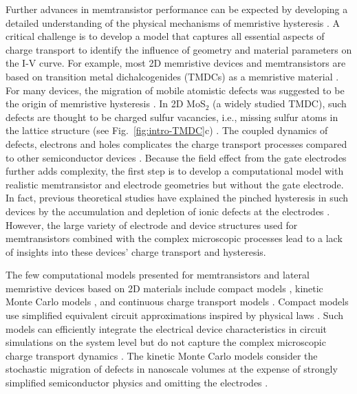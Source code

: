 \documentclass[10pt,a4paper, final]{article}
\theoremstyle{definition}								%
\numberwithin{equation}{section}
\numberwithin{figure}{section}
\numberwithin{theorem}{section}
\begin{document}
Further advances in memtransistor performance can be expected by developing a detailed understanding of the physical mechanisms of memristive hysteresis \cite{Song.2023}.
A critical challenge is to develop a model that captures all essential aspects of charge transport to identify the influence of geometry and material parameters on the I-V curve.
For example, most 2D memristive devices and memtransistors are based on transition metal dichalcogenides (TMDCs) as a memristive material \cite{Su.2021, Wang.2022b, Wang.2020c, Sangwan.2018, Geim.2013}.
For many devices, the migration of mobile atomistic defects was suggested to be the origin of memristive hysteresis \cite{Sangwan.2018c, Jadwiszczak.2019, DaLi.2018, Ge.2018, Sangwan.2015}.
In 2D MoS$\mathrm{_2}$ (a widely studied TMDC), such defects are thought to be charged sulfur vacancies, i.e., missing sulfur atoms in the lattice structure (see Fig.~\ref{fig:intro-TMDC}c) \cite{Sangwan.2018c, Jadwiszczak.2019, DaLi.2018, Sangwan.2015}.
The coupled dynamics of defects, electrons and holes complicates the charge transport processes compared to other semiconductor devices \cite{Thakkar.2024}.
Because the field effect from the gate electrodes further adds complexity, the first step is to develop a computational model with realistic memtransistor and electrode geometries but without the gate electrode.
In fact, previous theoretical studies have explained the pinched hysteresis in such devices by the accumulation and depletion of ionic defects at the electrodes \cite{Sivan.2022, Spetzler.2024}.
However, the large variety of electrode and device structures used for memtransistors combined with the complex microscopic processes lead to a lack of insights into these devices' charge transport and hysteresis.

The few computational models presented for memtransistors and lateral memristive devices based on 2D materials include compact models \cite{Sangwan.2018c, Spetzler.2022, Zhou.2023b}, kinetic Monte Carlo models \cite{Aldana.2023b, Aldana.2023}, and continuous charge transport models \cite{Sivan.2022,  Spetzler.2024}.
Compact models use simplified equivalent circuit approximations inspired by physical laws \cite{Ielmini.2017}.
Such models can efficiently integrate the electrical device characteristics in circuit simulations on the system level but do not capture the complex microscopic charge transport dynamics \cite{Ielmini.2017, Gao.2021}.
The kinetic Monte Carlo models consider the stochastic migration of defects in nanoscale volumes at the expense of strongly simplified semiconductor physics and omitting the electrodes \cite{Aldana.2023b, Aldana.2023}.
\end{document}
